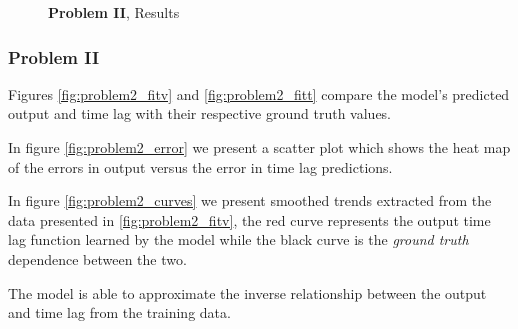 \documentclass[envcountsect,runningheads]{llncs}
\theoremstyle{etoile}
\begin{document}
\begin{figure}
  
  
  \caption{\textbf{Problem II}, Results}
\end{figure}




\subsubsection{Problem II}

Figures \ref{fig:problem2_fitv} and \ref{fig:problem2_fitt} compare the model's predicted output 
and time lag with their respective ground truth values.

In figure \ref{fig:problem2_error} we present a scatter plot which shows the heat map of the 
errors in output versus the error in time lag predictions.

In figure \ref{fig:problem2_curves} we present smoothed trends extracted from the data presented in 
\ref{fig:problem2_fitv}, the red curve represents the output time lag function learned by the model 
while the black curve is the \emph{ground truth} dependence between the two. 

The model is able to approximate the inverse relationship between the output and 
time lag from the training data.
\end{document}
